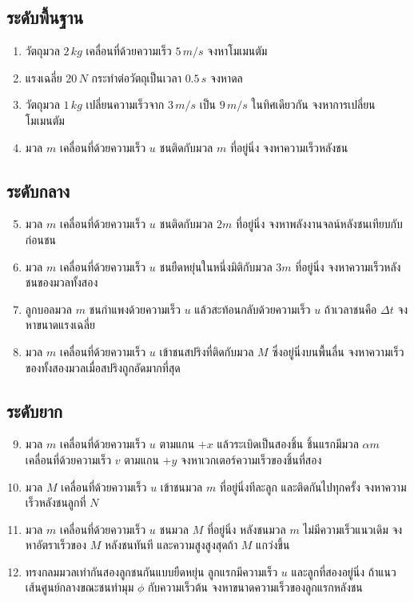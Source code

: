\subsection*{ระดับพื้นฐาน}

\begin{enumerate}
    \item วัตถุมวล $2\,\si{kg}$ เคลื่อนที่ด้วยความเร็ว $5\,\si{m/s}$ จงหาโมเมนตัม
    \item แรงเฉลี่ย $20\,\si{N}$ กระทำต่อวัตถุเป็นเวลา $0.5\,\si{s}$ จงหาดล
    \item วัตถุมวล $1\,\si{kg}$ เปลี่ยนความเร็วจาก $3\,\si{m/s}$ เป็น $9\,\si{m/s}$ ในทิศเดียวกัน จงหาการเปลี่ยนโมเมนตัม
    \item มวล $m$ เคลื่อนที่ด้วยความเร็ว $u$ ชนติดกับมวล $m$ ที่อยู่นิ่ง จงหาความเร็วหลังชน
\end{enumerate}

\subsection*{ระดับกลาง}

\begin{enumerate}
    \setcounter{enumi}{4}
    \item มวล $m$ เคลื่อนที่ด้วยความเร็ว $u$ ชนติดกับมวล $2m$ ที่อยู่นิ่ง จงหาพลังงานจลน์หลังชนเทียบกับก่อนชน
    \item มวล $m$ เคลื่อนที่ด้วยความเร็ว $u$ ชนยืดหยุ่นในหนึ่งมิติกับมวล $3m$ ที่อยู่นิ่ง จงหาความเร็วหลังชนของมวลทั้งสอง
    \item ลูกบอลมวล $m$ ชนกำแพงด้วยความเร็ว $u$ แล้วสะท้อนกลับด้วยความเร็ว $u$ ถ้าเวลาชนคือ $\Delta t$ จงหาขนาดแรงเฉลี่ย
    \item มวล $m$ เคลื่อนที่ด้วยความเร็ว $u$ เข้าชนสปริงที่ติดกับมวล $M$ ซึ่งอยู่นิ่งบนพื้นลื่น จงหาความเร็วของทั้งสองมวลเมื่อสปริงถูกอัดมากที่สุด
\end{enumerate}

\subsection*{ระดับยาก}

\begin{enumerate}
    \setcounter{enumi}{8}
    \item มวล $m$ เคลื่อนที่ด้วยความเร็ว $u$ ตามแกน $+x$ แล้วระเบิดเป็นสองชิ้น ชิ้นแรกมีมวล $\alpha m$ เคลื่อนที่ด้วยความเร็ว $v$ ตามแกน $+y$ จงหาเวกเตอร์ความเร็วของชิ้นที่สอง
    \item มวล $M$ เคลื่อนที่ด้วยความเร็ว $u$ เข้าชนมวล $m$ ที่อยู่นิ่งทีละลูก และติดกันไปทุกครั้ง จงหาความเร็วหลังชนลูกที่ $N$
    \item มวล $m$ เคลื่อนที่ด้วยความเร็ว $u$ ชนมวล $M$ ที่อยู่นิ่ง หลังชนมวล $m$ ไม่มีความเร็วแนวเดิม จงหาอัตราเร็วของ $M$ หลังชนทันที และความสูงสูงสุดถ้า $M$ แกว่งขึ้น
    \item ทรงกลมมวลเท่ากันสองลูกชนกันแบบยืดหยุ่น ลูกแรกมีความเร็ว $u$ และลูกที่สองอยู่นิ่ง ถ้าแนวเส้นศูนย์กลางขณะชนทำมุม $\phi$ กับความเร็วต้น จงหาขนาดความเร็วของลูกแรกหลังชน
\end{enumerate}

